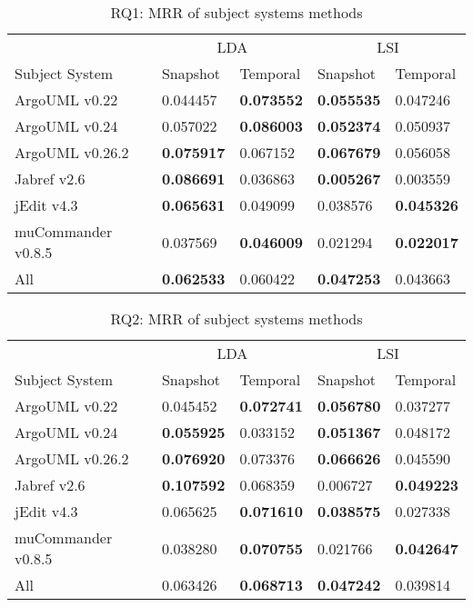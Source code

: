 \begin{table}[ht]
\renewcommand{\arraystretch}{1.3}
\centering
\caption{RQ1: MRR of subject systems methods}
\begin{tabular}{l|ll|ll}
    \toprule
                         & \multicolumn{2}{c|}{LDA}      &  \multicolumn{2}{c}{LSI}  \\
    Subject System       & Snapshot      & Temporal      & Snapshot      & Temporal  \\
    \midrule
ArgoUML v0.22 & 0.044457 & {\bf 0.073552 } & {\bf 0.055535 } & 0.047246  \\
ArgoUML v0.24 & 0.057022 & {\bf 0.086003 } & {\bf 0.052374 } & 0.050937  \\
ArgoUML v0.26.2 & {\bf 0.075917 } & 0.067152 & {\bf 0.067679 } & 0.056058  \\
Jabref v2.6 & {\bf 0.086691 } & 0.036863 & {\bf 0.005267 } & 0.003559  \\
jEdit v4.3 & {\bf 0.065631 } & 0.049099 & 0.038576 & {\bf 0.045326 }  \\
muCommander v0.8.5 & 0.037569 & {\bf 0.046009 } & 0.021294 & {\bf 0.022017 }  \\
    \midrule
All & {\bf 0.062533 } & 0.060422 & {\bf 0.047253 } & 0.043663  \\
    \bottomrule
\end{tabular}
\label{table:rq1:methods}
\end{table}

\begin{table}[ht]
\renewcommand{\arraystretch}{1.3}
\centering
\caption{RQ2: MRR of subject systems methods}
\begin{tabular}{l|ll|ll}
    \toprule
                        & \multicolumn{2}{c|}{LDA}      &  \multicolumn{2}{c}{LSI}  \\
    Subject System      & Snapshot      & Temporal      & Snapshot      & Temporal  \\
    \midrule
ArgoUML v0.22 & 0.045452 & {\bf 0.072741 } & {\bf 0.056780 } & 0.037277 \\
ArgoUML v0.24 & {\bf 0.055925 } & 0.033152 & {\bf 0.051367 } & 0.048172 \\
ArgoUML v0.26.2 & {\bf 0.076920 } & 0.073376 & {\bf 0.066626 } & 0.045590 \\
Jabref v2.6 & {\bf 0.107592 } & 0.068359 & 0.006727 & {\bf 0.049223 } \\
jEdit v4.3 & 0.065625 & {\bf 0.071610 } & {\bf 0.038575 } & 0.027338 \\
muCommander v0.8.5 & 0.038280 & {\bf 0.070755 } & 0.021766 & {\bf 0.042647 } \\
    \midrule
All & 0.063426 & {\bf 0.068713 } & {\bf 0.047242 } & 0.039814 \\
    \bottomrule
\end{tabular}
\label{table:rq2:methods}
\end{table}




